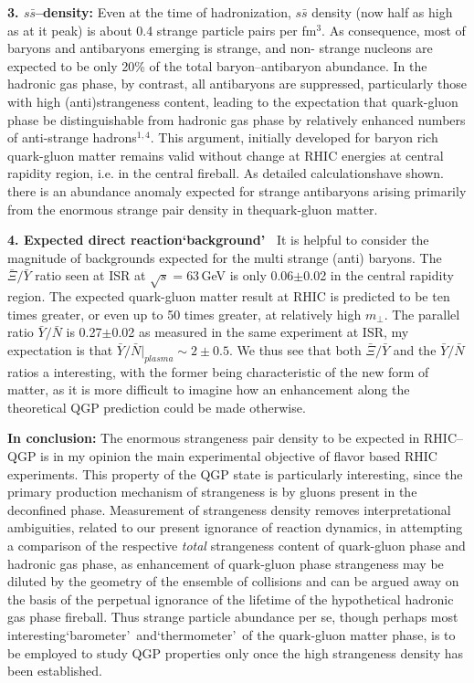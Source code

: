 \begin{mdframed}[linecolor=gray,roundcorner=12pt,backgroundcolor=Dandelion!15,linewidth=1pt,leftmargin=0cm,rightmargin=0cm,topline=true,bottomline=true,skipabove=12pt]
{\bf 3. $s\bar s$--density:} Even at the time of hadronization, $s\bar s$ density (now half as high as at it peak) is about 0.4 strange particle pairs per fm$^3$. As consequence, most of baryons and antibaryons emerging is strange, and non- strange nucleons are expected to be only 20\% of the total baryon--antibaryon abundance\footnotemark[5]. In the hadronic gas phase, by contrast, all antibaryons are suppressed, particularly those with high (anti)strangeness content\footnotemark[5], leading to the expectation that quark-gluon phase be distinguishable from hadronic gas phase by relatively enhanced numbers of anti-strange hadrons$^{1,4}$. This argument, initially developed for baryon rich quark-gluon matter remains valid without change at RHIC energies at central rapidity region, i.e. in the central fireball. As detailed calculations\footnotemark[5]  have shown. there is an abundance anomaly expected for strange antibaryons arising primarily from the enormous strange pair density in thequark-gluon matter.  

{\bf 4. Expected direct reaction\lq background\rq\ } It is helpful to consider the magnitude of backgrounds expected for the multi strange (anti) baryons. The $\bar \Xi / \bar Y$ ratio seen at ISR at $\sqrt{s}=63$\,GeV is only 0.06$\pm$0.02 in the central rapidity region\footnotemark[15]. The expected quark-gluon matter result at RHIC is predicted to be ten times greater\footnotemark[5], or even up to 50 times greater\footnotemark[11], at relatively high $m_\perp$. The parallel ratio $\bar Y/\bar N$ is 0.27$\pm$0.02 as measured in the same experiment at ISR, my expectation is that $\bar Y/\bar N\vert_{plasma} \sim 2 \pm 0.5$. We thus see that both $\bar \Xi/\bar Y$ and the $\bar Y/\bar N$ ratios a interesting, with the former being characteristic of the new form of matter, as it is more difficult to imagine how an enhancement along the theoretical QGP prediction could be made otherwise.  

{\bf In conclusion:} The enormous strangeness pair density to be expected in RHIC--QGP is in my opinion the main experimental objective of flavor based RHIC experiments. This property of the QGP state is particularly interesting, since the primary production mechanism of strangeness is by gluons present in the deconfined phase. Measurement of strangeness density removes interpretational ambiguities, related to our present ignorance of reaction dynamics, in attempting a comparison of the respective {\em total} strangeness content of quark-gluon phase and hadronic gas phase, as enhancement of quark-gluon phase strangeness may be diluted by the geometry of the ensemble of collisions and can be argued away on the basis of the perpetual ignorance of the lifetime of the hypothetical hadronic gas phase fireball. Thus strange particle abundance per se, though perhaps most interesting\lq barometer\rq\ and\lq thermometer\rq\ of the quark-gluon matter phase, is to be employed to study QGP properties only once the high strangeness density has been established.  


\end{mdframed}
